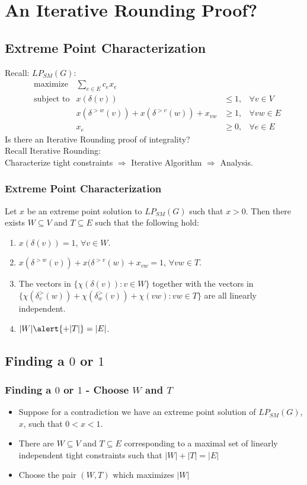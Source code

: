 \documentclass{beamer}
\begin{document}
\section{An Iterative Rounding Proof?}
\subsection{Extreme Point Characterization}
\begin{frame}
Recall: $LP_{SM}(G)$:
\begin{align*}
&\text{maximize} &\sum_{e \in E} c_e x_e \\
&\text{subject to} &x(\delta(v)) &\leq 1, &\forall v \in V\\
& &x(\delta^{>w}(v)) + x(\delta^{>v}(w)) + x_{vw} &\geq 1, &\forall vw \in E\\
& &x_e &\geq 0, &\forall e \in E
\end{align*}
Is there an Iterative Rounding proof of integrality?\\
Recall Iterative Rounding: \\Characterize tight constraints $\Rightarrow$ Iterative Algorithm $\Rightarrow$ Analysis.
\end{frame}

\begin{frame}
\frametitle{Extreme Point Characterization}
Let $x$ be an extreme point solution to $LP_{SM}(G)$ such that $x>0$. Then there exists $W \subseteq V$ and \alert{$T \subseteq E$} such that the following hold:
\begin{enumerate}
\item $x(\delta(v)) = 1$, $\forall v \in W$.
\item\alert<1->{ $x(\delta^{>w}(v))+ x(\delta^{>v}(w) + x_{vw} = 1$, $\forall vw \in T$.}
\item The vectors in $\{\chi(\delta(v)) : v \in W\}$ together with the vectors in \alert<1->{$\{\chi(\delta_v^>(w)) + \chi(\delta_w^>(v)) + \chi(vw) : vw \in T\}$} are all linearly independent.
\item $|W| \alert{+ |T|} = |E|$.
\end{enumerate}
\end{frame}

\subsection{Finding a $0$ or $1$}

\begin{frame}
\frametitle{Finding a $0$ or $1$ - Choose $W$ and $T$}
\begin{itemize}
\item Suppose for a contradiction we have an extreme point solution of $LP_{SM}(G)$, $x$, such that $0 < x < 1$. 
\item There are $W \subseteq V$ and $T \subseteq E$ corresponding to a maximal set of linearly independent tight constraints such that $|W| + |T| = |E|$
\item Choose the pair $(W,T)$ which  maximizes $|W|$
\end{itemize}
\end{frame}
\end{document}
